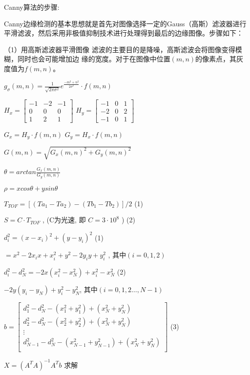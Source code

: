 Canny算法的步骤:

Canny边缘检测的基本思想就是首先对图像选择一定的Gauss（高斯）滤波器进行平滑滤波，然后采用非极值抑制技术进行处理得到最后的边缘图像。步骤如下：

（1）用高斯滤波器平滑图像
滤波的主要目的是降噪，高斯滤波会将图像变得模糊，同时也会可能增加边
缘的宽度。对于在图像中位置$(m,n)$的像素点，其灰度值为$f(m,n)$。

\bf{$g_{\sigma}(m,n) = \frac{1}{\sqrt{2\pi\sigma^2}} e^{\frac{-m^2+n^2}{2{\sigma^2}}} \cdot f(m,n) $}


$H_x = \begin{bmatrix} -1 & -2 & -1 \\ 0 & 0 & 0  \\ 1 & 2 & 1\end{bmatrix}$ \quad{}
$H_y = \begin{bmatrix} -1 & 0 & 1 \\ -2 & 0 & 2  \\ -1 & 0 & 1\end{bmatrix}$

$ G_x = H_y \cdot f(m,n)$ \quad{} $ G_y = H_x \cdot f(m,n)$


$G(m,n) = \sqrt{G_x(m,n) ^2 + G_y(m,n)^2}$

$\theta = arctan \frac{G_x(m,n)}{G_y(m,n)} $

\quad{}

$\rho = xcos \theta +ysin \theta$

\quad{}

$T_{TOF} =[(Ta_1 - Ta_2) - (Tb_1 - Tb_2)] /2 $ \quad{}\quad{}(1)

\quad{}

$ S= C \cdot T_{TOF}$ , \quad{}(C为光速, 即 $C=3\cdot 10^8$ ) \quad{}\quad{}(2)

\quad{}

$d_i^2 = (x - x_i)^2 + (y - y_i)^2 $ \quad{}\quad{}(1)

\quad$ = x^2 -2x_ix + x_i^2 + y^2 - 2y_iy + y_i^2$ , \quad{}其中$(i = 0,1,2)$

\quad

$d_i^2 - d_N^2 = -2x(x_i^2 - x_N^2) + x_i^2 -x_N^2 $ \quad{}\quad{}(2)

\quad\quad\quad\quad{} $- 2y(y_i-y_N) + y_i^2 - y_N^2$, \quad{}其中$(i = 0,1,2\dots, N-1)$

\quad{}

$b = \begin{bmatrix} d_1^2 - d_N^2 - (x_1^2 + y_1^2) + (x_N^2 + y_N^2) \\ d_2^2 - d_N^2 - (x_2^2 + y_2^2) + (x_N^2 + y_N^2) \\ \vdots \\d_{N-1}^2 - d_N^2 - (x_{N-1}^2 + y_{N-1}^2) + (x_N^2 + y_N^2) \\\end{bmatrix}$ \quad{}\quad{}(3)

\quad

$X = (A^TA)^{-1}A^Tb$ \quad{} 求解